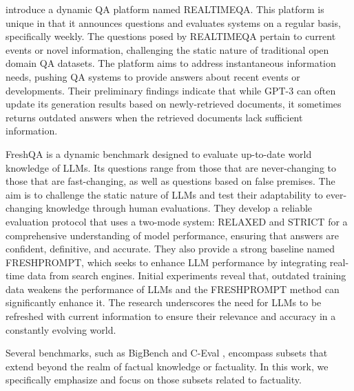 \citet{kasai2022realtimeqa} introduce a dynamic QA platform named REALTIMEQA. This platform is unique in that it announces questions and evaluates systems on a regular basis, specifically weekly. The questions posed by REALTIMEQA pertain to current events or novel information, challenging the static nature of traditional open domain QA datasets. The platform aims to address instantaneous information needs, pushing QA systems to provide answers about recent events or developments. Their preliminary findings indicate that while GPT-3 can often update its generation results based on newly-retrieved documents, it sometimes returns outdated answers when the retrieved documents lack sufficient information. 


FreshQA \citep{vu2023freshllms} is a dynamic benchmark designed to evaluate up-to-date world knowledge of LLMs. Its questions range from those that are never-changing to those that are fast-changing, as well as questions based on false premises. The aim is to challenge the static nature of LLMs and test their adaptability to ever-changing knowledge through human evaluations. They develop a reliable evaluation protocol that uses a two-mode system: RELAXED and STRICT for a comprehensive understanding of model performance, ensuring that answers are confident, definitive, and accurate. They also provide a strong baseline named FRESHPROMPT, which seeks to enhance LLM performance by integrating real-time data from search engines. Initial experiments reveal that, outdated training data weakens the performance of LLMs and the FRESHPROMPT method can significantly enhance it. The research underscores the need for LLMs to be refreshed with current information to ensure their relevance and accuracy in a constantly evolving world.

Several benchmarks, such as BigBench \citep{BigBench} and C-Eval \citep{C-Eval}, encompass subsets that extend beyond the realm of factual knowledge or factuality. In this work, we specifically emphasize and focus on those subsets related to factuality.

